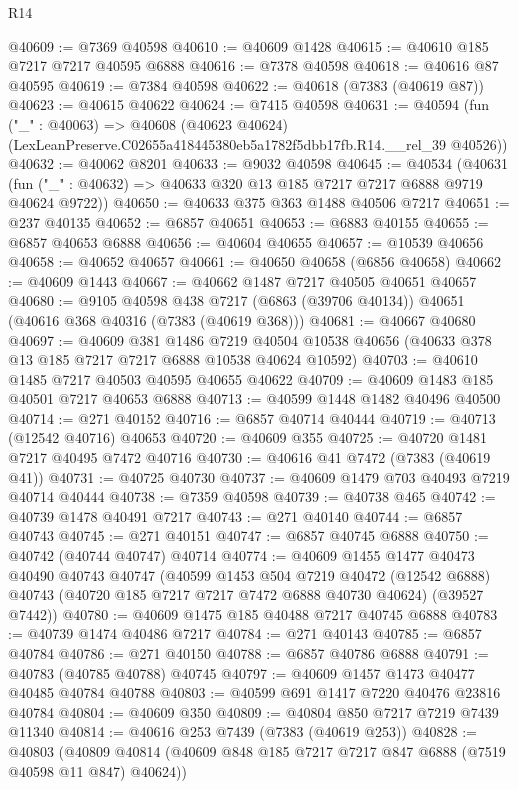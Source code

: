\begin{lexlean}{R14}
\begin{coremodule}
@40609 := @7369 @40598
@40610 := @40609 @1428
@40615 := @40610 @185 @7217 @7217 @40595 @6888
@40616 := @7378 @40598
@40618 := @40616 @87 @40595
@40619 := @7384 @40598
@40622 := @40618 (@7383 (@40619 @87))
@40623 := @40615 @40622
@40624 := @7415 @40598
@40631 := @40594
    (fun ("_" : @40063) =>
    @40608 (@40623 @40624) (LexLeanPreserve.C02655a418445380eb5a1782f5dbb17fb.R14.__rel_39 @40526))
@40632 := @40062 @8201
@40633 := @9032 @40598
@40645 := @40534
    (@40631 (fun ("_" : @40632) => @40633 @320 @13 @185 @7217 @7217 @6888 @9719 @40624 @9722))
@40650 := @40633 @375 @363 @1488 @40506 @7217
@40651 := @237 @40135
@40652 := @6857 @40651
@40653 := @6883 @40155
@40655 := @6857 @40653 @6888
@40656 := @40604 @40655
@40657 := @10539 @40656
@40658 := @40652 @40657
@40661 := @40650 @40658 (@6856 @40658)
@40662 := @40609 @1443
@40667 := @40662 @1487 @7217 @40505 @40651 @40657
@40680 := @9105
    @40598
    @438
    @7217
    (@6863 (@39706 @40134))
    @40651
    (@40616 @368 @40316 (@7383 (@40619 @368)))
@40681 := @40667 @40680
@40697 := @40609
    @381
    @1486
    @7219
    @40504
    @10538
    @40656
    (@40633 @378 @13 @185 @7217 @7217 @6888 @10538 @40624 @10592)
@40703 := @40610 @1485 @7217 @40503 @40595 @40655 @40622
@40709 := @40609 @1483 @185 @40501 @7217 @40653 @6888
@40713 := @40599 @1448 @1482 @40496 @40500
@40714 := @271 @40152
@40716 := @6857 @40714 @40444
@40719 := @40713 (@12542 @40716) @40653
@40720 := @40609 @355
@40725 := @40720 @1481 @7217 @40495 @7472 @40716
@40730 := @40616 @41 @7472 (@7383 (@40619 @41))
@40731 := @40725 @40730
@40737 := @40609 @1479 @703 @40493 @7219 @40714 @40444
@40738 := @7359 @40598
@40739 := @40738 @465
@40742 := @40739 @1478 @40491 @7217
@40743 := @271 @40140
@40744 := @6857 @40743
@40745 := @271 @40151
@40747 := @6857 @40745 @6888
@40750 := @40742 (@40744 @40747) @40714
@40774 := @40609
    @1455
    @1477
    @40473
    @40490
    @40743
    @40747
    (@40599
      @1453
      @504
      @7219
      @40472
      (@12542 @6888)
      @40743
      (@40720 @185 @7217 @7217 @7472 @6888 @40730 @40624)
      (@39527 @7442))
@40780 := @40609 @1475 @185 @40488 @7217 @40745 @6888
@40783 := @40739 @1474 @40486 @7217
@40784 := @271 @40143
@40785 := @6857 @40784
@40786 := @271 @40150
@40788 := @6857 @40786 @6888
@40791 := @40783 (@40785 @40788) @40745
@40797 := @40609 @1457 @1473 @40477 @40485 @40784 @40788
@40803 := @40599 @691 @1417 @7220 @40476 @23816 @40784
@40804 := @40609 @350
@40809 := @40804 @850 @7217 @7219 @7439 @11340
@40814 := @40616 @253 @7439 (@7383 (@40619 @253))
@40828 := @40803
    (@40809 @40814 (@40609 @848 @185 @7217 @7217 @847 @6888 (@7519 @40598 @11 @847) @40624))

\end{coremodule}
\end{lexlean}
